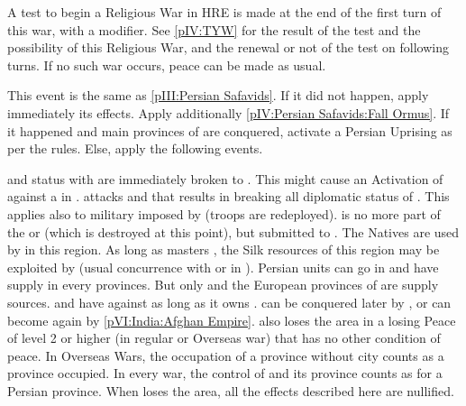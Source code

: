 \phpaix
\aparag A test to begin a Religious War in HRE is made at the end of the first
turn of this war, with a  modifier.  See \ref{pIV:TYW} for the
result of the test and the possibility of this Religious War, and the renewal
or not of the test on following turns.  If no such war occurs, peace can be
made as usual.










\condition{}
\aparag This event is the same as \ref{pIII:Persian Safavids}.  If it did not
happen, apply immediately its effects. Apply additionally \ref{pIV:Persian
  Safavids:Fall Ormus}.
\aparag If it happened and main provinces of \paysperse are conquered,
activate a Persian Uprising as per the rules.
\aparag Else, apply the following events.

\phevnt
{}\label{pIV:Persian Safavids:Fall Ormus} \dipAT and
\dipFR status with \paysOrmus are immediately broken to \dipNR. This might
cause an Activation of \paysperse against a \TP in \paysOrmus.
 \paysperse attacks \paysOman and that results in
breaking all diplomatic status of \paysOman. This applies also to military
\dipAT imposed by \PORmin (troops are redeployed).
\bparag {} is no more part of the \paysMogol or
\paysAfghans (which is destroyed at this point), but submitted to
\paysperse. The Natives are used by \paysperse in this region.
\bparag As long as \paysPerse masters , the Silk
resources of this region may be exploited by \provinceOrmus (usual concurrence
with \TP or \COL in ).
\bparag Persian units can go in  and have supply in
every provinces. But only \villeHerat and the European provinces of \paysperse
are supply sources.
\bparag \RUS and \TUR have \OCB against \paysperse as long as it owns
.
\bparag {} can be conquered later by \paysMogol, or
can become \paysAfghans again by \ref{pVI:India:Afghan Empire}.
\bparag \paysperse also loses the area in a losing Peace of level 2 or higher
(in regular or Overseas war) that has no other condition of peace. In Overseas
Wars, the occupation of a province without city counts as a province
occupied. In every war, the control of \villeHerat and its province counts as
for a Persian province.
\bparag When \paysperse loses the area, all the effects described here are
nullified.



